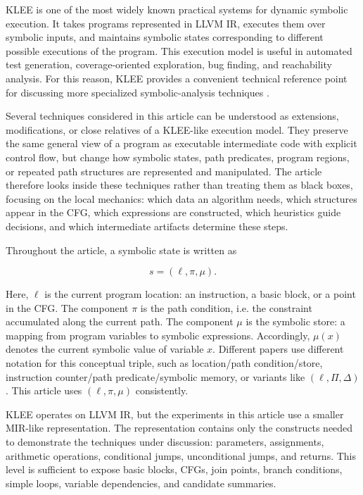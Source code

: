 \documentclass[conference]{IEEEtran}
\begin{document}
KLEE is one of the most widely known practical systems for dynamic symbolic
execution. It takes programs represented in LLVM IR, executes them over
symbolic inputs, and maintains symbolic states corresponding to different
possible executions of the program. This execution model is useful in automated
test generation, coverage-oriented exploration, bug finding, and reachability
analysis. For this reason, KLEE provides a convenient technical reference point
for discussing more specialized symbolic-analysis techniques \cite{klee}.

Several techniques considered in this article can be understood as extensions,
modifications, or close relatives of a KLEE-like execution model. They preserve
the same general view of a program as executable intermediate code with explicit
control flow, but change how symbolic states, path predicates, program regions,
or repeated path structures are represented and manipulated. The article
therefore looks inside these techniques rather than treating them as black boxes,
focusing on the local mechanics: which data an algorithm needs, which
structures appear in the CFG, which expressions are constructed, which
heuristics guide decisions, and which intermediate artifacts determine these
steps.

Throughout the article, a symbolic state is written as

\[
s = (\ell, \pi, \mu).
\]

Here, \(\ell\) is the current program location: an instruction, a basic block,
or a point in the CFG. The component \(\pi\) is the path condition, i.e. the
constraint accumulated along the current path. The component \(\mu\) is the
symbolic store: a mapping from program variables to symbolic expressions.
Accordingly, \(\mu(x)\) denotes the current symbolic value of variable \(x\).
Different papers use different notation for this conceptual triple, such as
location/path condition/store, instruction counter/path predicate/symbolic
memory, or variants like \((\ell, \Pi, \Delta)\). This article uses
\((\ell, \pi, \mu)\) consistently.

KLEE operates on LLVM IR, but the experiments in this article use a smaller
MIR-like representation. The representation contains only the constructs needed
to demonstrate the techniques under discussion: parameters, assignments,
arithmetic operations, conditional jumps, unconditional jumps, and returns. This
level is sufficient to expose basic blocks, CFGs, join points, branch
conditions, simple loops, variable dependencies, and candidate summaries.
\end{document}
